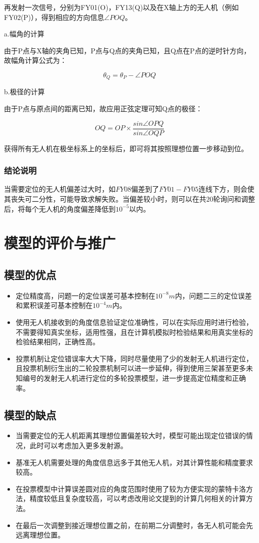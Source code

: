 \documentclass{ctexart}
\begin{document}
再发射一次信号，分别为FY01(O)，FY13(Q)以及在X轴上方的无人机（例如FY02(P)），得到相应的方向信息$\angle POQ$。

a.幅角的计算

由于P点与X轴的夹角已知，P点与Q点的夹角已知，且Q点在P点的逆时针方向，故幅角计算公式为：

\begin{equation}
  \theta_Q=\theta_P-\angle POQ
\end{equation}

b.极径的计算

由于P点与原点间的距离已知，故应用正弦定理可知Q点的极径：

\[
  OQ=OP\times \frac{sin \angle OPQ}{sin\angle OQP}
\]

获得所有无人机在极坐标系上的坐标后，即可将其按照理想位置一步移动到位。

\subsubsection{结论说明}

当需要定位的无人机偏差过大时，如$FY08$偏差到了$FY01-FY05$连线下方，则会使其丧失可二分性，可能导致求解失败。当偏差较小时，则可以在共$20$轮询问和调整后，将每个无人机的角度偏差降低到$10^{-5}$以内。

\section{模型的评价与推广}
\subsection{模型的优点}
    \begin{itemize}
      \item 定位精度高，问题一的定位误差可基本控制在$10^{-8}m$内，问题二三的定位误差和累积误差可基本控制在$10^{-4}m$内。
      \item 使用无人机接收到的角度信息验证定位准确性，可以在实际应用时进行检验，不需要得知真实坐标，适用性强，且在计算机模拟时检验结果和用真实坐标的检验结果相同，正确性高。
      \item 投票机制让定位错误率大大下降，同时尽量使用了少的发射无人机进行定位，且投票机制衍生出的二轮投票机制可以进一步延伸，得到使用三架甚至更多未知编号的发射无人机进行定位的多轮投票模型，进一步提高定位精度和正确率。
    \end{itemize}
\subsection{模型的缺点}
    \begin{itemize}
      \item 当需要定位的无人机距离其理想位置偏差较大时，模型可能出现定位错误的情况，此时可以考虑加入更多发射源。
      \item 基准无人机需要处理的角度信息远多于其他无人机，对其计算性能和精度要求较高。
      \item 在投票模型中计算误差圆对应的角度范围时使用了较为方便实现的蒙特卡洛方法，精度较低且复杂度较高，可以考虑改用论文提到的计算几何相关的计算方法。
      \item 在最后一次调整到接近理想位置之前，在前期二分调整时，各无人机可能会先远离理想位置。
    \end{itemize}
\end{document}
